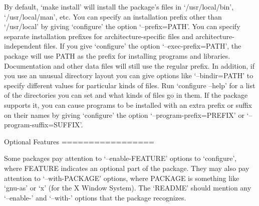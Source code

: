 \begin{DoxyCodeInclude}
   By \textcolor{keywordflow}{default}, `make install\textcolor{stringliteral}{' will install the package'}s files in
`/usr/local/bin\textcolor{stringliteral}{', `/usr/local/man'}, etc.  You can specify an
installation prefix other than `/usr/local\textcolor{stringliteral}{' by giving `configure'} the
option `--prefix=PATH\textcolor{stringliteral}{'.}
\textcolor{stringliteral}{}
\textcolor{stringliteral}{   You can specify separate installation prefixes for}
\textcolor{stringliteral}{architecture-specific files and architecture-independent files.  If you}
\textcolor{stringliteral}{give `configure'} the option `--exec-prefix=PATH\textcolor{stringliteral}{', the package will use}
\textcolor{stringliteral}{PATH as the prefix for installing programs and libraries.}
\textcolor{stringliteral}{Documentation and other data files will still use the regular prefix.}
\textcolor{stringliteral}{}
\textcolor{stringliteral}{   In addition, if you use an unusual directory layout you can give}
\textcolor{stringliteral}{options like `--bindir=PATH'} to specify different values \textcolor{keywordflow}{for} particular
kinds of files.  Run `configure --help\textcolor{stringliteral}{' for a list of the directories}
\textcolor{stringliteral}{you can set and what kinds of files go in them.}
\textcolor{stringliteral}{}
\textcolor{stringliteral}{   If the package supports it, you can cause programs to be installed}
\textcolor{stringliteral}{with an extra prefix or suffix on their names by giving `configure'} the
option `--program-prefix=PREFIX\textcolor{stringliteral}{' or `--program-suffix=SUFFIX'}.

Optional Features
=================

   Some packages pay attention to `--enable-FEATURE\textcolor{stringliteral}{' options to}
\textcolor{stringliteral}{`configure'}, where FEATURE indicates an optional part of the package.
They may also pay attention to `--with-PACKAGE\textcolor{stringliteral}{' options, where PACKAGE}
\textcolor{stringliteral}{is something like `gnu-as'} or `x\textcolor{stringliteral}{' (for the X Window System).  The}
\textcolor{stringliteral}{`README'} should mention any `--enable-\textcolor{stringliteral}{' and `--with-'} options that the
package recognizes.


\end{DoxyCodeInclude}
